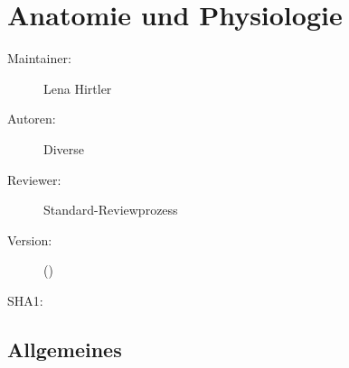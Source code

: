 \def\ChapterCode{ANA}
\chapter
[\CO{[ANA]} Anatomie und Physiologie]
{Anatomie und Physiologie}
\label{chp:ANA}%
\label{chp:VIT}%

\ChapterIntro
{%

} {%
\begin{description}
  \item[Maintainer:] Lena Hirtler
  \item[Autoren:] Diverse
  \item[Reviewer:] Standard-Reviewprozess
  \item[Version:] {\VarDocVersionTypeName} ({\VarDocVersionTypeDescription})
  \item[SHA1:] {\DocGitCommit}
\end{description}

{\TxTeilkapitelAASS}
}

\nocite{AumuellerAnatomie2}%
\nocite{BenninghoffAnatomie17Bd1}%
\nocite{LeohnhardtAnatomie3}
\nocite{LippertAnatomie7}%
\nocite{PlatzerTaschenatlasAnat8Bd1}%
\nocite{WaldeyerAnatomie17}%

% 

\bigskip

\section{Allgemeines}

